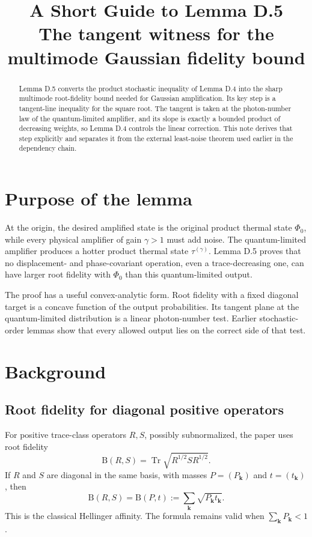 \documentclass[11pt]{article}
\title{A Short Guide to Lemma D.5\\
\large The tangent witness for the multimode Gaussian fidelity bound}
\author{}
\date{}
\newcommand{\Tr}{\operatorname{Tr}}
\newcommand{\B}{\mathrm B}
\begin{document}
\maketitle

\begin{abstract}
Lemma D.5 converts the product stochastic inequality of Lemma D.4 into the
sharp multimode root-fidelity bound needed for Gaussian amplification.  Its
key step is a tangent-line inequality for the square root.  The tangent is
taken at the photon-number law of the quantum-limited amplifier, and its
slope is exactly a bounded product of decreasing weights, so Lemma D.4
controls the linear correction.  This note derives that step explicitly and
separates it from the external least-noise theorem used earlier in the
dependency chain.
\end{abstract}

\section{Purpose of the lemma}

At the origin, the desired amplified state is the original product thermal
state $\Phi_0$, while every physical amplifier of gain $\gamma>1$ must add
noise.  The quantum-limited amplifier produces a hotter product thermal state
$\tau^{(\gamma)}$.  Lemma D.5 proves that no displacement- and
phase-covariant operation, even a trace-decreasing one, can have larger root
fidelity with $\Phi_0$ than this quantum-limited output.

The proof has a useful convex-analytic form.  Root fidelity with a fixed
diagonal target is a concave function of the output probabilities.  Its
tangent plane at the quantum-limited distribution is a linear
photon-number test.  Earlier stochastic-order lemmas show that every allowed
output lies on the correct side of that test.

\section{Background}

\subsection{Root fidelity for diagonal positive operators}

For positive trace-class operators $R,S$, possibly subnormalized, the paper
uses root fidelity
\[
  \B(R,S)=\Tr\sqrt{R^{1/2}SR^{1/2}}.
\]
If $R$ and $S$ are diagonal in the same basis, with masses
$P=(P_{\mathbf k})$ and $t=(t_{\mathbf k})$, then
\begin{equation}\label{eq:classical-B}
  \B(R,S)=\B(P,t):=
  \sum_{\mathbf k}\sqrt{P_{\mathbf k}t_{\mathbf k}}.
\end{equation}
This is the classical Hellinger affinity.  The formula remains valid when
$\sum_{\mathbf k}P_{\mathbf k}<1$.
\end{document}
